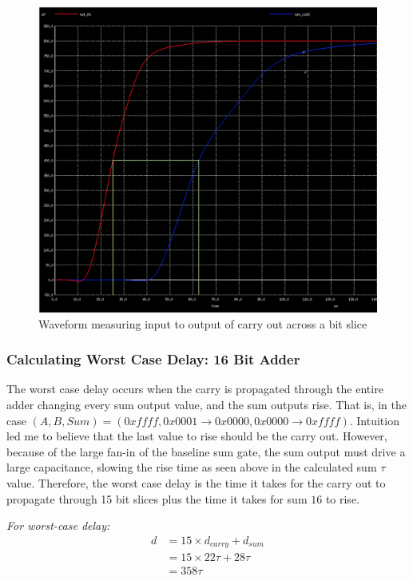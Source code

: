 \documentclass{article}
\begin{document}
\begin{figure}[H]
  \includegraphics[width=\linewidth]{baseline_screenshots/carry_out_waveform.png}
  \caption{Waveform measuring input to output of carry out across a bit slice}
  \label{fig:carry_out_waveform}
\end{figure}

\subsubsection{Calculating Worst Case Delay: 16 Bit Adder}
The worst case delay occurs when the carry is propagated through the entire adder changing every sum output value, and the sum outputs rise. That is, in the case $(A, B, Sum) = (0xffff, 0x0001 \rightarrow 0x0000, 0x0000 \rightarrow 0xffff)$. Intuition led me to believe that the last value to rise should be the carry out. However, because of the large fan-in of the baseline sum gate, the sum output must drive a large capacitance, slowing the rise time as seen above in the calculated sum $\tau$ value. Therefore, the worst case delay is the time it takes for the carry out to propagate through 15 bit slices plus the time it takes for sum $16$ to rise.

\textit{For worst-case delay:}\\
\begin{align*}
d &= 15 \times d_{carry} + d_{sum}\\
&= 15 \times 22\tau + 28\tau\\
&= 358\tau
\end{align*}
\end{document}
